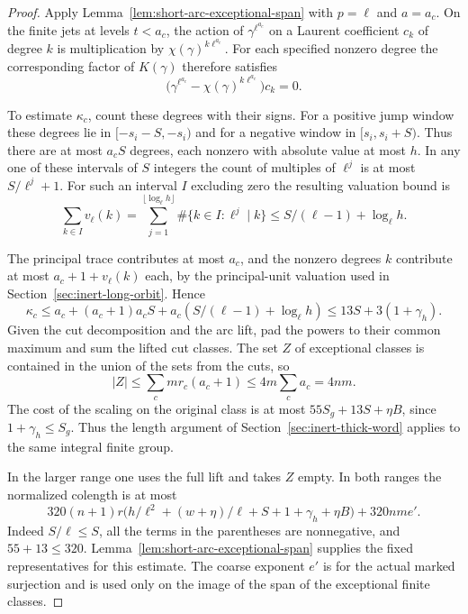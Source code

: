 \begin{proof}
Apply Lemma~\ref{lem:short-arc-exceptional-span} with \(p=\ell\) and \(a=a_c\).
On the finite jets at levels \(t<a_c\), the action of \(\gamma^{\ell^{a_c}}\)
on a Laurent coefficient \(c_k\) of degree \(k\) is multiplication by
\(\chi(\gamma)^{k\ell^{a_c}}\). For each specified nonzero degree
the corresponding factor of \(K(\gamma)\) therefore satisfies
\[
 \bigl(\gamma^{\ell^{a_c}}-\chi(\gamma)^{k\ell^{a_c}}\bigr)c_k=0 .
\]

To estimate \(\kappa_c\), count these degrees with their signs. For a positive
jump window these degrees lie in \([-s_i-S,-s_i)\) and for a
negative window in \([s_i,s_i+S)\). Thus there are at most
\(a_c S\) degrees, each nonzero with absolute value at most \(h\).
In any one of these intervals of \(S\) integers the count of
multiples of \(\ell^j\) is at most \(S/\ell^j+1\).
For such an interval \(I\) excluding zero the resulting valuation bound is
\[
 \sum_{k\in I}v_\ell(k)=\sum_{j=1}^{\lfloor\log_\ell h\rfloor}\#\{k\in I:\ell^j\mid k\}\le S/(\ell-1)+\log_\ell h.
\]

The principal trace contributes at most \(a_c\), and the
nonzero degrees \(k\) contribute at most \(a_c+1+v_\ell(k)\) each,
by the principal-unit valuation used in
Section~\ref{sec:inert-long-orbit}. Hence
\[
 \kappa_c\le a_c+(a_c+1)a_c S
                +a_c(S/(\ell-1)+\log_\ell h)
            \le13 S+3(1+\gamma_h).
\]
Given the cut decomposition and the arc lift, pad the powers to
their common maximum and sum the lifted cut classes.
The set \(Z\) of exceptional classes
is contained in the union of the sets from the cuts, so
\[
 |Z|\le\sum_c m r_c(a_c+1)\le4m\sum_c a_c=4nm .
\]
The cost of the scaling on the original class is at most
\(55S_g+13S+\eta B\), since \(1+\gamma_h\le S_g\).
Thus the length argument of Section~\ref{sec:inert-thick-word}
applies to the same integral finite group.

In the larger range
one uses the full lift and takes \(Z\) empty. In both ranges the
normalized colength is at most
\begin{equation}\label{eq:nonthick-colength}
 320(n+1)r\bigl(h/\ell^2+(w+\eta)/\ell+
                      S+1+\gamma_h+\eta B\bigr)+320nm e' .
\end{equation}
Indeed \(S/\ell\le S\), all the terms in the parentheses
are nonnegative, and \(55+13\le320\). Lemma~\ref{lem:short-arc-exceptional-span}
supplies the fixed representatives for this estimate. The coarse exponent
\(e'\) is for the actual marked surjection and is used only on the
image of the span of the exceptional finite classes.
\end{proof}

